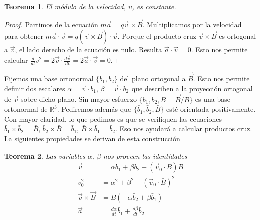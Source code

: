 \documentclass{article}
\newcommand{\realNumbers}{\mathbb{R}}
\newtheorem{theorem}{Teorema}
\begin{document}
  \begin{theorem}
    \label{theorem:modulusOfVelocityIsConstant}
    El módulo de la velocidad, \(v\), es constante.
  \end{theorem}
  \begin{proof}
    Partimos de la ecuación \(m \vec{a} = q \vec{v} \times \vec{B}\).
    Multiplicamos por la velocidad para obtener \(m \vec{a} \cdot \vec{v} = q (\vec{v} \times \vec{B}) \cdot \vec{v}\).
    Porque el producto cruz \(\vec{v} \times \vec{B}\) es ortogonal a \(\vec{v}\), el lado derecho de la ecuación es nulo.
    Resulta \(\vec{a} \cdot \vec{v} = 0\).
    Esto nos permite calcular \(\frac{d}{d t} v^2 = 2 \vec{v} \cdot \frac{d \vec{v}}{d t} = 2 \vec{a} \cdot \vec{v} = 0\).
  \end{proof}

  Fijemos una base ortonormal \(\{\bar{b}_1, \bar{b}_2\}\) del plano ortogonal a \(\vec{B}\).
  Esto nos permite definir dos escalares \(\alpha = \vec{v} \cdot \bar{b}_1\), \(\beta = \vec{v} \cdot \bar{b}_2\) que describen a la proyección ortogonal de \(\vec{v}\) sobre dicho plano.
  Sin mayor esfuerzo \(\{\bar{b}_1, \bar{b}_2, \bar{B} = \vec{B} / B\}\) es una base ortonormal de \(\realNumbers^3\).
  Pediremos además que \(\{\bar{b}_1, \bar{b}_2, \bar{B}\}\) esté orientada positivamente.
  Con mayor claridad, lo que pedimos es que se verifiquen las ecuaciones \(\bar{b}_1 \times \bar{b}_2 = \bar{B}\), \(\bar{b}_2 \times \bar{B} = \bar{b}_1\), \(\bar{B} \times \bar{b}_1 = \bar{b}_2\).
  Eso nos ayudará a calcular productos cruz.
  La siguientes propiedades se derivan de esta construcción
  \begin{theorem}
    Las variables \(\alpha\), \(\beta\) nos proveen las identidades
    \begin{align}
      \label{equation:alphaBetaFormulaForVelocity}
      \vec{v}
      &=
      \alpha \bar{b}_1 + \beta \bar{b}_2 + (\vec{v}_0 \cdot \bar{B}) \bar{B}
      \\
      \label{equation:alphaBetaFormulaForModulusOfVelocity}
      v_0^2
      &=
      \alpha^2 + \beta^2 + (\vec{v}_0 \cdot \bar{B})^2
      \\
      \label{equation:alphaBetaFormulaForCrossProduct}
      \vec{v} \times \vec{B}
      &=
      B (- \alpha \bar{b}_2 + \beta \bar{b}_1)
      \\
      \label{equation:alphaBetaFormulaForAcceleration}
      \vec{a}
      &=
      \frac{d \alpha}{d t} \bar{b}_1 + \frac{d \beta}{d t} \bar{b}_2
    \end{align}
  \end{theorem}
\end{document}
